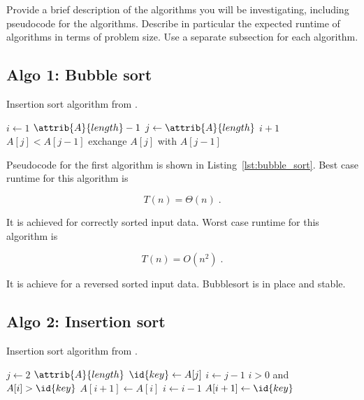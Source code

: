 
Provide a brief description of the algorithms you will be
investigating, including pseudocode for the algorithms. Describe in
particular the expected runtime of algorithms in terms of problem
size.  Use a separate subsection for each algorithm.

\subsection{Algo 1: Bubble sort}\label{sec:algo1}

\begin{algorithm}[H]
  \caption{Insertion sort algorithm from \cite[Ch.~2.1]{cormen_introduction_2009}.}
  \label{lst:bubble_sort}
  \begin{codebox}
    \li \For $i \gets 1$ \To $\attrib{A}{length} - 1$
    \li \Do \For $j \gets \attrib{A}{length}$ \Downto $i + 1$
    \li 	\Do \If $A[j] < A[j - 1]$
    \li         \Then exchange $A[j]$ with $A[j - 1]$
    \End    
    \End
    \End
  \end{codebox}
\end{algorithm}

Pseudocode for the first algorithm is shown in
Listing~\ref{lst:bubble_sort}. Best case runtime for this algorithm
is

\begin{equation}
  T(n) = \Theta(n) \;.  \label{eq:bub_sort_best}
\end{equation}

It is achieved for correctly sorted input data. Worst case runtime for this algorithm is

\begin{equation}
  T(n) = O(n^2) \;.  \label{eq:bub_sort_worst}
\end{equation}

It is achieve for a reversed sorted input data. Bubblesort is in place and stable.

\subsection{Algo 2: Insertion sort}\label{sec:algo2}

\begin{algorithm}[H]
  \caption{Insertion sort algorithm from \cite[Ch.~2.1]{cormen_introduction_2009}.}
  \label{lst:insertion_algo}
  \begin{codebox}
    \li \For $j \gets 2$ \To $\attrib{A}{length}$
    \li \Do
    $\id{key} \gets A[j]$
    \li     $i \gets j-1$
    \li      \While $i>0$ and $A[i] > \id{key}$
    \li      \Do
    $A[i+1] \gets A[i]$
    \li         $i \gets i-1$
    \End    
    \li       $A[i+1]\gets \id{key}$
    \End
  \end{codebox}
\end{algorithm}

